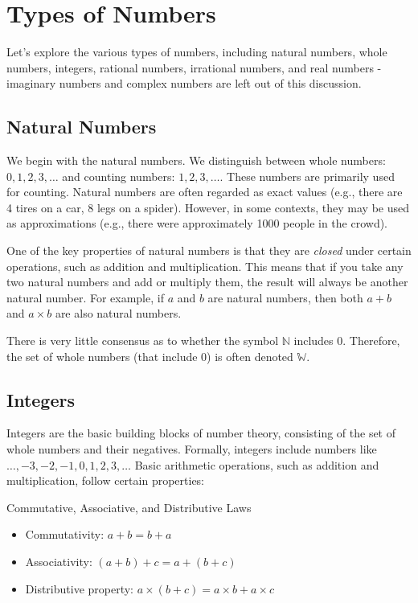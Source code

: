 \section{Types of Numbers}
Let's explore the various types of numbers, including natural numbers, whole numbers, integers, rational numbers, irrational numbers, and real numbers - imaginary numbers and complex numbers are left out of this discussion.

\subsection*{Natural Numbers}
We begin with the natural numbers. We distinguish between whole numbers: $0, 1, 2, 3, \ldots$ and counting numbers: $1, 2, 3, \ldots$. These numbers are primarily used for counting. Natural numbers are often regarded as exact values (e.g., there are 4 tires on a car, 8 legs on a spider). However, in some contexts, they may be used as approximations (e.g., there were approximately 1000 people in the crowd).

One of the key properties of natural numbers is that they are \textit{closed} under certain operations, such as addition and multiplication. This means that if you take any two natural numbers and add or multiply them, the result will always be another natural number. For example, if $a$ and $b$ are natural numbers, then both $a + b$ and $a \times b$ are also natural numbers.

There is very little consensus as to whether the symbol $\mathbb{N}$ includes 0. Therefore, the set of whole numbers (that include 0) is often denoted $\mathbb{W}$.

\subsection*{Integers}
Integers are the basic building blocks of number theory, consisting of the set of whole numbers and their negatives. Formally, integers include numbers like $\ldots,-3,-2,-1,0,1,2,3, \ldots$ Basic arithmetic operations, such as addition and multiplication, follow certain properties:

\begin{custombox}{{Commutative, Associative, and Distributive Laws}}


    \begin{itemize}
    \item Commutativity: $a+b=b+a$
    \item Associativity: $(a+b)+c=a+(b+c)$
    \item Distributive property: $a \times(b+c)=a \times b+a \times c$
    \end{itemize}
    
\end{custombox}


